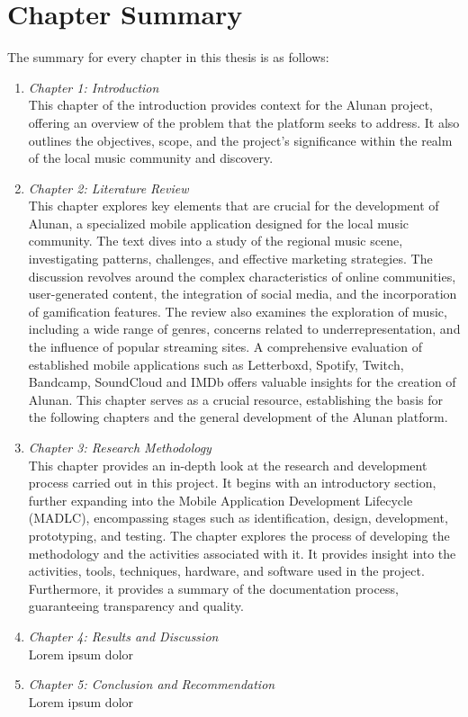 \section{Chapter Summary}
The summary for every chapter in this thesis is as follows:
\begin{enumerate}[1.]
    \item \textit{Chapter 1: Introduction} \\
    This chapter of the introduction provides context for the Alunan project, offering an overview of the problem that the platform seeks to address. It also outlines the objectives, scope, and the project's significance within the realm of the local music community and discovery.
    \item \textit{Chapter 2: Literature Review} \\
    This chapter explores key elements that are crucial for the development of Alunan, a specialized mobile application designed for the local music community. The text dives into a study of the regional music scene, investigating patterns, challenges, and effective marketing strategies. The discussion revolves around the complex characteristics of online communities, user-generated content, the integration of social media, and the incorporation of gamification features. The review also examines the exploration of music, including a wide range of genres, concerns related to underrepresentation, and the influence of popular streaming sites. A comprehensive evaluation of established mobile applications such as Letterboxd, Spotify, Twitch, Bandcamp, SoundCloud and IMDb offers valuable insights for the creation of Alunan. This chapter serves as a crucial resource, establishing the basis for the following chapters and the general development of the Alunan platform.
    \item \textit{Chapter 3: Research Methodology} \\
    This chapter provides an in-depth look at the research and development process carried out in this project. It begins with an introductory section, further expanding into the Mobile Application Development Lifecycle (MADLC), encompassing stages such as identification, design, development, prototyping, and testing. The chapter explores the process of developing the methodology and the activities associated with it. It provides insight into the activities, tools, techniques, hardware, and software used in the project. Furthermore, it provides a summary of the documentation process, guaranteeing transparency and quality.
    \item \textit{Chapter 4: Results and Discussion} \\
    Lorem ipsum dolor
    \item \textit{Chapter 5: Conclusion and Recommendation} \\
    Lorem ipsum dolor
\end{enumerate}